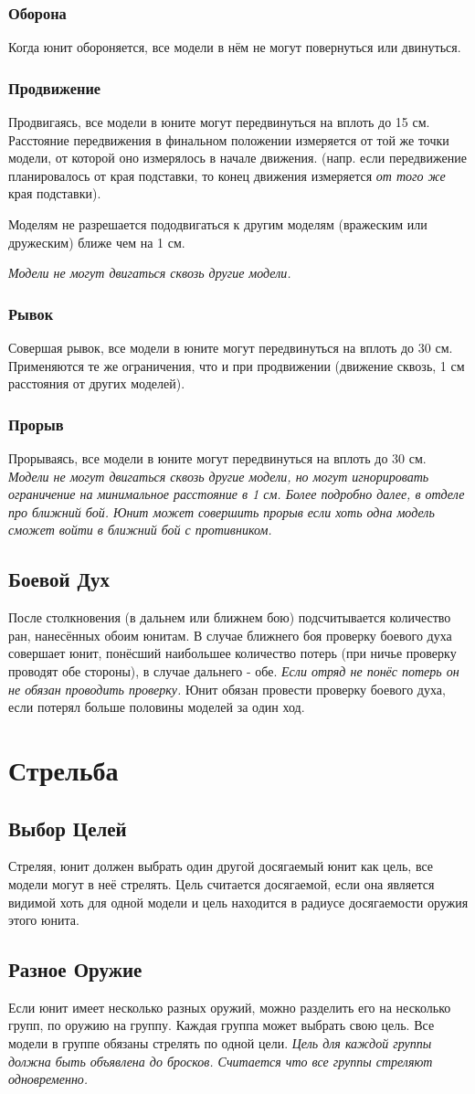 \documentclass[twocolumn]{article}
\newcommand{\ssec}[1]{\section{#1}\label{sec:#1}}
\newcommand{\subsec}[1]{\subsection{#1}\label{subsec:#1}}
\newcommand{\subsubsec}[1]{\subsubsection{#1}\label{subsubsec:#1}}
\begin{document}
\newpage


\subsubsec{Оборона}
Когда юнит обороняется, все модели в нём не могут повернуться или двинуться.

\subsubsec{Продвижение}
Продвигаясь, все модели в юните могут передвинуться на вплоть до 15 см. Расстояние передвижения в финальном положении измеряется от той же точки модели, от которой оно измерялось в начале движения. (напр. если передвижение планировалось от края подставки, то конец движения измеряется \emph{от того же} края подставки).

Моделям не разрешается пододвигаться к другим моделям (вражеским или дружеским) ближе чем на 1 см.

\emph{Модели не могут двигаться сквозь другие модели.}

\subsubsec{Рывок}
Совершая рывок, все модели в юните могут передвинуться на вплоть до 30 см. Применяются те же ограничения, что и при продвижении (движение сквозь, 1 см расстояния от других моделей).

\subsubsec{Прорыв}
Прорываясь, все модели в юните могут передвинуться на вплоть до 30 см. \emph{Модели не могут двигаться сквозь другие модели, но могут игнорировать ограничение на минимальное расстояние в 1 см. Более подробно далее, в отделе про ближний бой. Юнит может совершить прорыв если хоть одна модель сможет войти в ближний бой с противником.}

\subsec{Боевой Дух}
После столкновения (в дальнем или ближнем бою) подсчитывается количество ран, нанесённых обоим юнитам. В случае ближнего боя проверку боевого духа совершает юнит, понёсший наибольшее количество потерь (при ничье проверку проводят обе стороны), в случае дальнего - обе. \emph{Если отряд не понёс потерь он не обязан проводить проверку.} Юнит обязан провести проверку боевого духа, если потерял больше половины моделей за один ход.

\newpage

\ssec{Стрельба}
\subsec{Выбор Целей}
Стреляя, юнит должен выбрать один другой досягаемый юнит как цель, все модели могут в неё стрелять.
Цель считается досягаемой, если она является видимой хоть для одной модели и цель находится в радиусе досягаемости оружия этого юнита.
\subsec{Разное Оружие}
Если юнит имеет несколько разных оружий, можно разделить его на несколько групп, по оружию на группу. Каждая группа может выбрать свою цель. Все модели в группе обязаны стрелять по одной цели. \emph{Цель для каждой группы должна быть объявлена до бросков. Считается что все группы стреляют одновременно.}
\end{document}
